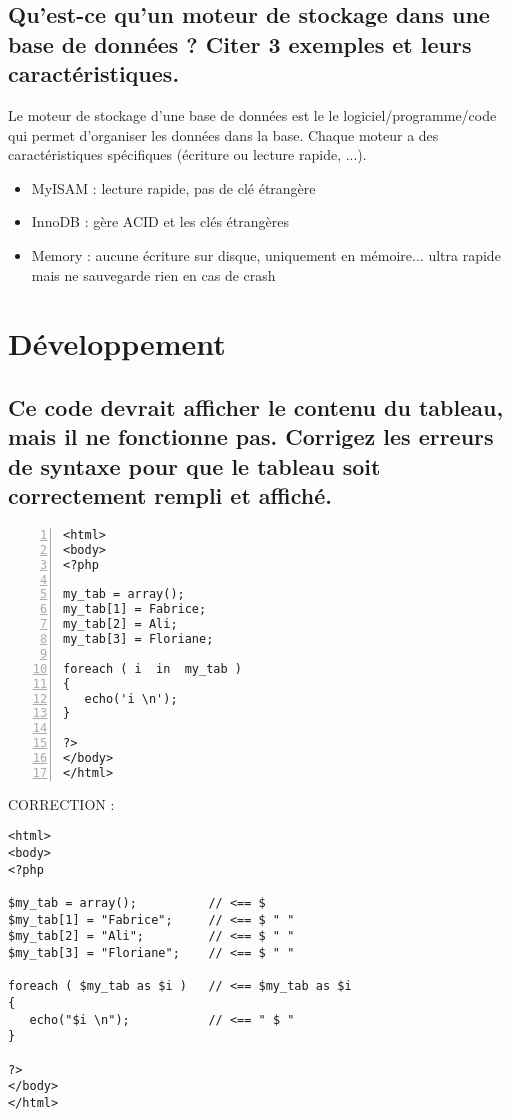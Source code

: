 \documentclass[11pt,a4paper]{article}
\begin{document}
\bigskip

\subsection{Qu'est-ce qu'un moteur de stockage dans une base de données ? Citer 3 exemples et leurs caractéristiques.}

\bigskip

Le moteur de stockage d'une base de données est le le logiciel/programme/code qui permet d'organiser les données dans la base.
Chaque moteur a des caractéristiques spécifiques (écriture ou lecture rapide, ...).

\begin{itemize}
\item MyISAM : lecture rapide, pas de clé étrangère
\item InnoDB : gère ACID et les clés étrangères
\item Memory : aucune écriture sur disque, uniquement en mémoire... ultra rapide mais ne sauvegarde rien en cas de crash
\end{itemize}

\bigskip

\section{Développement}

\subsection{Ce code devrait afficher le contenu du tableau, mais il ne fonctionne pas. Corrigez les erreurs de syntaxe pour que le tableau soit correctement rempli et affiché.}

\medskip

\lstset{language=php}
\begin{lstlisting}[frame=single,numbers=left]
<html>
<body>
<?php

my_tab = array();
my_tab[1] = Fabrice;
my_tab[2] = Ali;
my_tab[3] = Floriane;

foreach ( i  in  my_tab )
{
   echo('i \n');
}

?>
</body>
</html>
\end{lstlisting}


CORRECTION :

\medskip

\lstset{language=php}
\begin{lstlisting}[frame=single]
<html>
<body>
<?php

$my_tab = array();			// <== $
$my_tab[1] = "Fabrice";		// <== $ " "
$my_tab[2] = "Ali";			// <== $ " "
$my_tab[3] = "Floriane";	// <== $ " "

foreach ( $my_tab as $i )	// <== $my_tab as $i
{
   echo("$i \n");			// <== " $ "
}

?>
</body>
</html>
\end{lstlisting}
\end{document}
